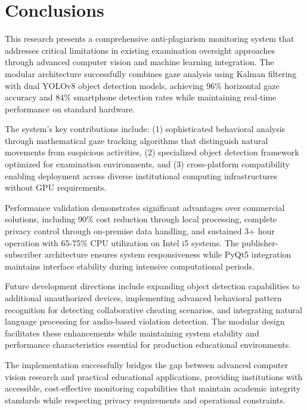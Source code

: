 \documentclass[conference]{IEEEtran}
\begin{document}
\section{Conclusions}

This research presents a comprehensive anti-plagiarism monitoring system that addresses critical limitations in existing examination oversight approaches through advanced computer vision and machine learning integration. The modular architecture successfully combines gaze analysis using Kalman filtering with dual YOLOv8 object detection models, achieving 96\% horizontal gaze accuracy and 84\% smartphone detection rates while maintaining real-time performance on standard hardware.

The system's key contributions include: (1) sophisticated behavioral analysis through mathematical gaze tracking algorithms that distinguish natural movements from suspicious activities, (2) specialized object detection framework optimized for examination environments, and (3) cross-platform compatibility enabling deployment across diverse institutional computing infrastructures without GPU requirements.

Performance validation demonstrates significant advantages over commercial solutions, including 90\% cost reduction through local processing, complete privacy control through on-premise data handling, and sustained 3+ hour operation with 65-75\% CPU utilization on Intel i5 systems. The publisher-subscriber architecture ensures system responsiveness while PyQt5 integration maintains interface stability during intensive computational periods.

Future development directions include expanding object detection capabilities to additional unauthorized devices, implementing advanced behavioral pattern recognition for detecting collaborative cheating scenarios, and integrating natural language processing for audio-based violation detection. The modular design facilitates these enhancements while maintaining system stability and performance characteristics essential for production educational environments.

The implementation successfully bridges the gap between advanced computer vision research and practical educational applications, providing institutions with accessible, cost-effective monitoring capabilities that maintain academic integrity standards while respecting privacy requirements and operational constraints.
\end{document}
